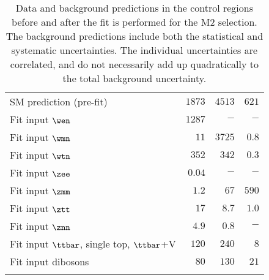 \begin{table}[!ht]
\begin{center}
{\begin{tabular*}{\textwidth}{@{\extracolsep{\fill}}lrrr}
    SM prediction (pre-fit)    & $1873$          & $4513$          & $621$              \\
    \noalign{\smallskip}\hline\noalign{\smallskip}
    Fit input $\wen$         & $1287$          & $-$          & $-$              \\
    Fit input $\wmn$         & $11$          & $3725$          & $0.8$              \\
    Fit input $\wtn$         & $352$          & $342$          & $0.3$              \\
    Fit input $\zee$         & $0.04$          & $-$          & $-$              \\
    Fit input $\zmm$         & $1.2$          & $67$          & $590$              \\
    Fit input $\ztt$         & $17$          & $8.7$          & $1.0$              \\
    Fit input $\znn$         & $4.9$          & $0.8$          & $-$              \\
    Fit input $\ttbar$, single top, $\ttbar$+V     & $120$          & $240$          & $8$              \\
    Fit input dibosons         & $80$          & $130$          & $21$              \\
    \noalign{\smallskip}\hline\noalign{\smallskip}
  \end{tabular*}
}
\end{center}
\caption{Data and background predictions in the control regions before and after the fit is performed for the M2 selection.
  The background predictions include both the statistical and systematic uncertainties.
    The individual uncertainties are correlated, and do not necessarily add up
    quadratically to the total background uncertainty.}
    \label{tab:ControlRegion_M2}
    \end{table}
